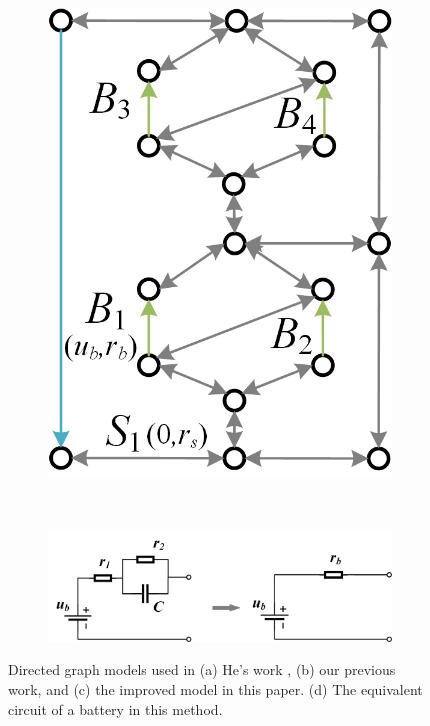 \documentclass{article}
\begin{document}
\begin{figure}[htbp]
\begin{subfigure}[b]{0.24\textwidth}
        \includegraphics[width=\textwidth]{direct-graph-my.png}
        \caption{}
        \label{fig:direct-graph-my}
    \end{subfigure}
    \\
    \begin{subfigure}[b]{0.8\textwidth}
        \includegraphics[width=\textwidth]{battery_simple.png}
        \caption{}
        \label{fig:battery_simple}
    \end{subfigure}
    \caption{ 
        Directed graph models used in (a) He's work \cite{heExploringAdaptiveReconfiguration2013}, (b) our previous work, and (c) the improved model in this paper.
        (d) The equivalent circuit of a battery in this method.
    }
\end{figure}
\end{document}
